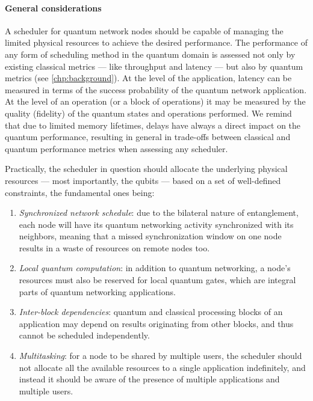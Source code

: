 \paragraph{General considerations}

A scheduler for quantum network nodes should be capable of managing the limited physical resources
to achieve the desired performance. The performance of any form of scheduling method in the quantum
domain is assessed not only by existing classical metrics --- like throughput and latency --- but
also by quantum metrics (see \cref{chp:background}). At the level of the application, latency can be
measured in terms of the success probability of the quantum network application. At the level of an
operation (or a block of operations) it may be measured by the quality (fidelity) of the quantum
states and operations performed. We remind that due to limited memory lifetimes, delays have always
a direct impact on the quantum performance, resulting in general in trade-offs between classical and
quantum performance metrics when assessing any scheduler.

Practically, the scheduler in question should allocate the underlying physical resources --- most
importantly, the qubits --- based on a set of well-defined constraints, the fundamental ones being:

\begin{enumerate}
    \item \emph{Synchronized network schedule}: due to the bilateral nature of entanglement, each
          node will have its quantum networking activity synchronized with its neighbors, meaning
          that a missed synchronization window on one node results in a waste of resources on remote
          nodes too.
    \item \emph{Local quantum computation}: in addition to quantum networking, a node's resources
          must also be reserved for local quantum gates, which are integral parts of quantum
          networking applications.
    \item \emph{Inter-block dependencies}: quantum and classical processing blocks of an application
          may depend on results originating from other blocks, and thus cannot be scheduled
          independently.
    \item \emph{Multitasking}: for a node to be shared by multiple users, the scheduler should not
          allocate all the available resources to a single application indefinitely, and instead it
          should be aware of the presence of multiple applications and multiple users.
\end{enumerate}

